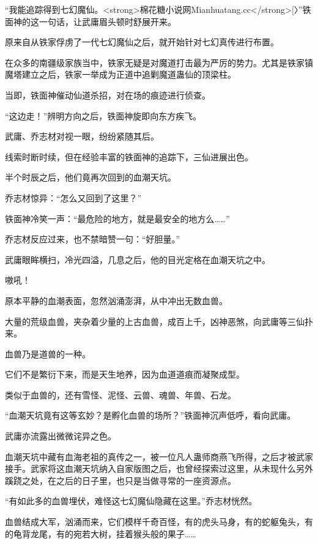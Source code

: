 
\begin{this_body}

“我能追踪得到七幻魔仙。<strong>棉花糖小说网Mianhuatang.cc</strong>[〉”铁面神的这一句话，让武庸眉头顿时舒展开来。

原来自从铁家俘虏了一代七幻魔仙之后，就开始针对七幻真传进行布置。

在众多的南疆级家族当中，铁家无疑是对魔道打击最为严厉的势力。尤其是铁家镇魔塔建立之后，铁家一举成为正道中追剿魔道蛊仙的顶梁柱。

当即，铁面神催动仙道杀招，对在场的痕迹进行侦查。

“这边走！”辨明方向之后，铁面神旋即向东方疾飞。

武庸、乔志材对视一眼，纷纷紧随其后。

线索时断时续，但在经验丰富的铁面神的追踪下，三仙进展出色。

半个时辰之后，他们竟再次回到的血潮天坑。

乔志材惊异：“怎么又回到了这里？”

铁面神冷笑一声：“最危险的地方，就是最安全的地方么……”

乔志材反应过来，也不禁暗赞一句：“好胆量。”

武庸眼眸横扫，冷光四溢，几息之后，他的目光定格在血潮天坑之中。

嗷吼！

原本平静的血潮表面，忽然汹涌澎湃，从中冲出无数血兽。

大量的荒级血兽，夹杂着少量的上古血兽，成百上千，凶神恶煞，向武庸等三仙扑来。

血兽乃是道兽的一种。

它们不是繁衍下来，而是天生地养，因为血道道痕而凝聚成型。

类似于血兽的，还有雪怪、泥怪、云兽、魂兽、年兽、石龙。

“血潮天坑竟有这等玄妙？是孵化血兽的场所？”铁面神沉声低呼，看向武庸。

武庸亦流露出微微诧异之色。

血潮天坑中藏有血海老祖的真传之一，被一位凡人蛊师商燕飞所得，之后才被武家接手。武家将这血潮天坑纳入自家版图之后，也曾经探索过这里，从未现什么另外蹊跷之处，在之后的日子里，也只是当做寻常的一座资源点。

“有如此多的血兽埋伏，难怪这七幻魔仙隐藏在这里。”乔志材恍然。

血兽结成大军，汹涌而来，它们模样千奇百怪，有的虎头马身，有的蛇躯兔头，有的龟背龙尾，有的宛若大树，挂着猴头般的果子……


\end{this_body}

